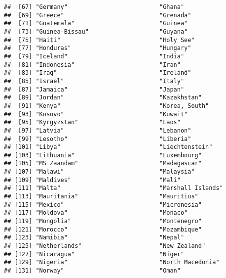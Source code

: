 \documentclass[]{tufte-handout}
\begin{document}
\begin{verbatim}
##  [67] "Germany"                          "Ghana"                           
##  [69] "Greece"                           "Grenada"                         
##  [71] "Guatemala"                        "Guinea"                          
##  [73] "Guinea-Bissau"                    "Guyana"                          
##  [75] "Haiti"                            "Holy See"                        
##  [77] "Honduras"                         "Hungary"                         
##  [79] "Iceland"                          "India"                           
##  [81] "Indonesia"                        "Iran"                            
##  [83] "Iraq"                             "Ireland"                         
##  [85] "Israel"                           "Italy"                           
##  [87] "Jamaica"                          "Japan"                           
##  [89] "Jordan"                           "Kazakhstan"                      
##  [91] "Kenya"                            "Korea, South"                    
##  [93] "Kosovo"                           "Kuwait"                          
##  [95] "Kyrgyzstan"                       "Laos"                            
##  [97] "Latvia"                           "Lebanon"                         
##  [99] "Lesotho"                          "Liberia"                         
## [101] "Libya"                            "Liechtenstein"                   
## [103] "Lithuania"                        "Luxembourg"                      
## [105] "MS Zaandam"                       "Madagascar"                      
## [107] "Malawi"                           "Malaysia"                        
## [109] "Maldives"                         "Mali"                            
## [111] "Malta"                            "Marshall Islands"                
## [113] "Mauritania"                       "Mauritius"                       
## [115] "Mexico"                           "Micronesia"                      
## [117] "Moldova"                          "Monaco"                          
## [119] "Mongolia"                         "Montenegro"                      
## [121] "Morocco"                          "Mozambique"                      
## [123] "Namibia"                          "Nepal"                           
## [125] "Netherlands"                      "New Zealand"                     
## [127] "Nicaragua"                        "Niger"                           
## [129] "Nigeria"                          "North Macedonia"                 
## [131] "Norway"                           "Oman"                            

\end{verbatim}
\end{document}
